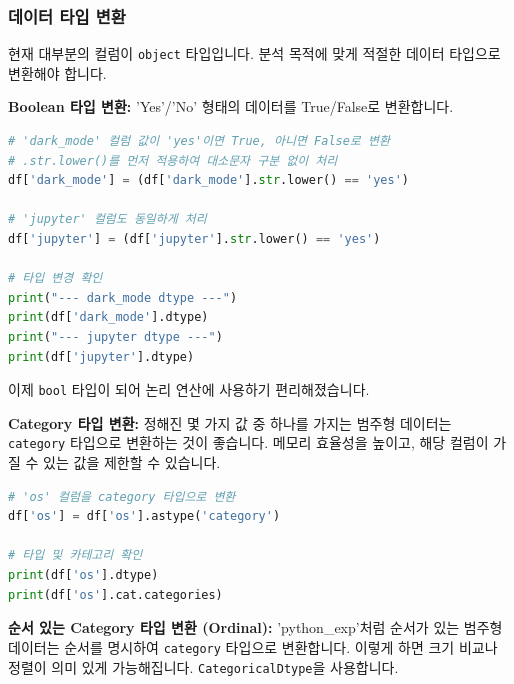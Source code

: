 \documentclass[11pt,a4paper]{book}
\theoremstyle{definition}
\begin{document}
\subsubsection{데이터 타입 변환}

현재 대부분의 컬럼이 \texttt{object} 타입입니다. 분석 목적에 맞게 적절한 데이터 타입으로 변환해야 합니다.

\textbf{Boolean 타입 변환:} 'Yes'/'No' 형태의 데이터를 True/False로 변환합니다.

\begin{codeexamplebox}
\begin{lstlisting}[language=Python, caption={Boolean 타입 변환}, label={lst:astype_bool}, breaklines=true]
# 'dark_mode' 컬럼 값이 'yes'이면 True, 아니면 False로 변환
# .str.lower()를 먼저 적용하여 대소문자 구분 없이 처리
df['dark_mode'] = (df['dark_mode'].str.lower() == 'yes')

# 'jupyter' 컬럼도 동일하게 처리
df['jupyter'] = (df['jupyter'].str.lower() == 'yes')

# 타입 변경 확인
print("--- dark_mode dtype ---")
print(df['dark_mode'].dtype)
print("--- jupyter dtype ---")
print(df['jupyter'].dtype)
\end{lstlisting}
\end{codeexamplebox}
이제 \texttt{bool} 타입이 되어 논리 연산에 사용하기 편리해졌습니다.

\textbf{Category 타입 변환:} 정해진 몇 가지 값 중 하나를 가지는 범주형 데이터는 \texttt{category} 타입으로 변환하는 것이 좋습니다. 메모리 효율성을 높이고, 해당 컬럼이 가질 수 있는 값을 제한할 수 있습니다.

\begin{codeexamplebox}
\begin{lstlisting}[language=Python, caption={Category 타입 변환}, label={lst:astype_category}, breaklines=true]
# 'os' 컬럼을 category 타입으로 변환
df['os'] = df['os'].astype('category')

# 타입 및 카테고리 확인
print(df['os'].dtype)
print(df['os'].cat.categories)
\end{lstlisting}
\end{codeexamplebox}

\textbf{순서 있는 Category 타입 변환 (Ordinal):} 'python\_exp'처럼 순서가 있는 범주형 데이터는 순서를 명시하여 \texttt{category} 타입으로 변환합니다. 이렇게 하면 크기 비교나 정렬이 의미 있게 가능해집니다. \texttt{CategoricalDtype}을 사용합니다.
\end{document}
